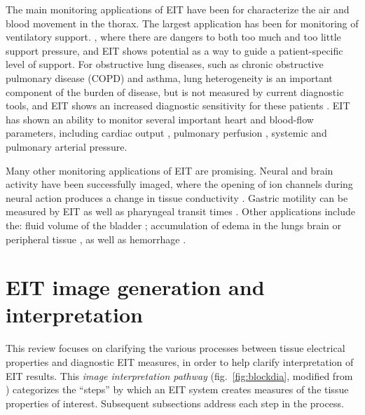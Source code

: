 \documentclass[12pt]{article} \usepackage[margin=3cm]{geometry} \usepackage[margin=20pt,font=small,labelfont=bf]{caption}\def\TBLWIDA{35mm}\def\TBLWIDB{95mm}
\newcommand\fref[1]{fig.\ \ref{#1}}
\begin{document}
The main monitoring applications of EIT have been for characterize the air and
blood movement in the thorax.
The largest application has been for 
monitoring of ventilatory support.
 \cite{Frerichs2017Chest}, where
there are dangers to both too much and too little
support pressure, and EIT shows potential as a way to guide a
patient-specific level of support\cite{Wolf2013Mechanical}.
For obstructive lung diseases, such as chronic obstructive pulmonary disease
(COPD) and asthma, lung heterogeneity is an important component of the burden
of disease, but is not measured by current diagnostic
tools, and EIT shows an increased diagnostic sensitivity for these
patients \cite{Vogt2016Heterogeneity}.
EIT has shown an ability to monitor several important 
heart and blood-flow parameters, including 
cardiac output \cite{vonkNoordegraaf2000},
pulmonary perfusion \cite{Frerichs2002Perfusion},
systemic \cite{Sola2011Central} and pulmonary
arterial \cite{Proenca2016Noninvasive} pressure.

Many other monitoring applications of EIT are promising.
Neural and brain activity have been successfully imaged,
where the opening of ion channels during 
neural action produces a change in tissue
conductivity \cite{Aristovich2014Neural}.
Gastric motility can be measured by EIT 
as well as pharyngeal transit times \cite{Mangnall1987}.
Other applications include the:
fluid volume of the bladder \cite{Leonhardt2011Bladder};
accumulation of edema in the lungs \cite{Newell1996}
brain or peripheral tissue \cite{Abboud1995Peripheral}, as
well as hemorrhage \cite{Sadleir2009blood}.



\section{EIT image generation and interpretation}

This review focuses on clarifying the various processes 
between tissue electrical properties and diagnostic EIT measures,
in order to help clarify interpretation of EIT results.
This {\em image interpretation pathway}
(\fref{fig:blockdia}, modified from \cite{Frerichs2017Chest})
categorizes the ``steps'' by which an EIT system creates
measures of the tissue properties of interest.
Subsequent subsections address each step in the process.
\end{document}
